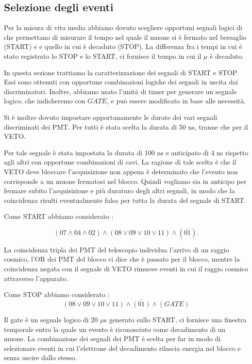 \documentclass[10pt,a4paper]{article}
\begin{document}
\subsection{Selezione degli eventi}

Per la misura di vita media abbiamo dovuto scegliere opportuni segnali logici di che permettano di misurare il tempo nel quale il muone si è fermato nel bersaglio (START) e e quello in cui è decaduto (STOP). La differenza fra i tempi in cui è stato registrato lo STOP e lo START, ci fornisce il tempo in cui il $\mu$ è decaduto.

In questa sezione trattiamo la caratterizzazione dei segnali di START e STOP. Essi sono ottenuti con opportune combinazioni logiche dei segnali in uscita dai discriminatori. Inoltre, abbiamo usato l'unità di timer per generare un segnale logico, che indicheremo con $GATE$, e può essere modificato in base alle necessità.

Si è inoltre dovuto impostare opportunamente le durate dei vari segnali discriminati dei PMT. Per tutti è stata scelta la durata di 50 ns, tranne che per il VETO.

Per tale segnale è stata impostata la durata di 100 ns e anticipato di 4 ns rispetto agli altri con opportune combinazioni di cavi. 
La ragione di tale scelta è che il VETO deve bloccare l'acquisizione non appena è determinato che l'evento non corrisponde a un muone fermatosi nel blocco. Quindi vogliamo sia in anticipo per fermare subito l'acquisizione e più duraturo degli altri segnali, in modo che la coincidenza risulti eventualmente falsa per tutta la durata del segnale di START.

Come START abbiamo considerato : 

\begin{equation}
(07\land04\land02)\land(08\lor09\lor10\lor11)\land (\bar{01}).
\end{equation}

La coincidenza tripla dei PMT del telescopio individua l'arrivo di un raggio cosmico, l'OR dei PMT del blocco ci dice che è passato per il blocco, mentre la coincidenza negata con il segnale di VETO rimuove eventi in cui il raggio cosmico attraverso l'apparato.

Come STOP abbiamo considerato : 
\begin{equation}
(08\lor09\lor10\lor11)\land\bar{(01)}\land(GATE)
\end{equation}

Il gate è un segnale logico di 20 $\mu$s generato sullo START, ci fornisce una finestra temporale entro la quale un evento è riconosciuto come decadimento di un muone. La combinazione dei segnali dei PMT è scelta per far in modo di selezionare eventi in cui l'elettrone del decadimento rilascia energia nel blocco e senza uscire dallo stesso.
\end{document}
